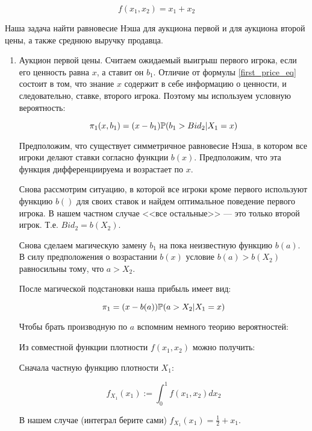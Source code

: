 \begin{equation}
f(x_{1},x_{2})=x_{1}+x_{2}
\end{equation}

Наша задача найти равновесие Нэша для аукциона первой и для аукциона второй цены, а также среднюю выручку продавца.

\begin{enumerate}
\item Аукцион первой цены. Считаем ожидаемый выигрыш первого игрока, если его ценность равна $ x $, а ставит он $ b_{1} $. Отличие от формулы \ref{first_price_eq} состоит в том, что знание $ x $ содержит в себе информацию о ценности, и следовательно, ставке, второго игрока. Поэтому мы используем условную вероятность:

\begin{equation}
\pi_{1}(x,b_{1})=(x-b_{1})\P(b_{1}>Bid_{2} |X_{1}=x)
\end{equation}

Предположим, что существует симметричное равновесие Нэша, в котором все игроки делают ставки согласно функции $ b(x) $. Предположим, что эта функция дифференциируема и возрастает по $ x $. 

Снова рассмотрим ситуацию, в которой все игроки кроме первого используют функцию $ b() $ для своих ставок и найдем оптимальное поведение первого игрока. В нашем частном случае <<все остальные>> --- это только второй игрок. Т.е. $ Bid_{2}=b(X_{2}) $.

Снова сделаем магическую замену $ b_{1} $ на пока неизвестную функцию $ b(a) $. В силу предположения о возрастании  $ b(x) $ условие $ b(a)>b(X_{2}) $ равносильны тому, что $ a>X_{2} $.

После магической подстановки наша прибыль имеет вид:

\begin{equation}
\pi_{1}=(x-b(a))\P(a>X_{2} |X_{1}=x)
\end{equation}


Чтобы брать производную по $ a $ вспомним немного теорию вероятностей:

Из совместной функции плотности $ f(x_{1},x_{2}) $ можно получить:

Сначала частную функцию плотности $ X_{1} $:

\begin{equation}
f_{X_{1}}(x_{1}):=\int_{0}^{1} f(x_{1},x_{2}) dx_{2}
\end{equation}

В нашем случае (интеграл берите сами) $ f_{X_{1}}(x_{1})=\frac{1}{2}+x_{1} $.


\end{enumerate}
